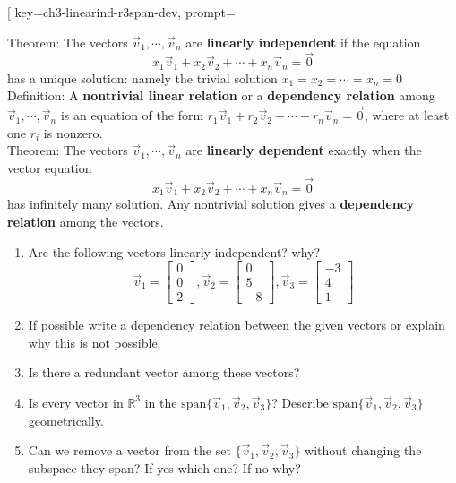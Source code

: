 
\begin{SaveQuestion}[
        key=ch3-linearind-r3span-dev,
        prompt={Theorem: The vectors $\vec v_1,\cdots, \vec v_n$ are \textbf{linearly independent} if the equation $$x_1\vec v_1+x_2\vec v_2+\cdots+x_n \vec v_n=\vec 0$$ has a unique solution: namely the trivial solution $x_1=x_2=\cdots=x_n=0$ \vspace{0.5 cm} \\ Definition: A \textbf{nontrivial linear relation} or a \textbf{dependency relation}  among $\vec v_1,\cdots, \vec v_n$  is an equation of the form $r_1\vec v_1+r_2\vec v_2+\cdots+r_n \vec v_n=\vec 0$, where at least one $r_i$ is nonzero. \vspace{0.5 cm} \\ Theorem: The vectors $\vec v_1,\cdots, \vec v_n$ are \textbf{linearly dependent} exactly when the vector equation $$x_1\vec v_1+x_2\vec v_2+\cdots+x_n \vec v_n=\vec 0$$ has infinitely many solution. Any nontrivial solution gives a \textbf{dependency relation} among the vectors.	\begin{enumerate} \item Are the following vectors linearly independent? why? \[ \vec v_1=	\begin{bmatrix} 0\\0\\2 \end{bmatrix}, 	\vec v_2=\begin{bmatrix} 0\\5\\-8 \end{bmatrix}, 	\vec v_3=\begin{bmatrix} -3\\4\\1 \end{bmatrix} \] \item If possible write a dependency relation between the given vectors or explain why this is not possible. \item Is there a redundant vector among these vectors? \item Is every vector in $\mathbb{R}^3$ in the $\mathrm {span}\{\vec v_1,\vec v_2,\vec v_3\}$? Describe $\mathrm {span}\{\vec v_1,\vec v_2,\vec v_3\}$ geometrically. \item Can we remove a vector from the set $\{\vec v_1,\vec v_2,\vec v_3\}$ without changing the subspace they span? If yes which one? If no why? \end{enumerate} }

\end{SaveQuestion}
